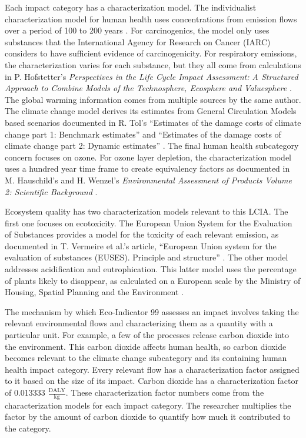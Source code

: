 \documentclass[final,journal,10pt,letterpaper,oneside,twocolumn,compsoc]%
{IEEEtran}
\begin{document}
Each impact category has a characterization model. The individualist
characterization model for human health uses concentrations from emission flows
over a period of 100 to 200 years \cite{pre-annex}. For carcinogenics, the model
only uses
substances that the International Agency for Research on Cancer (IARC) considers
to have sufficient evidence of carcinogenicity. For respiratory emissions, the
characterization varies for each substance, but they all come from calculations
in P. Hofstetter's
\textit{Perspectives in the Life Cycle Impact Assessment: A Structured Approach
to Combine Models of the Technosphere, Ecosphere and Valuesphere} \cite{lcia}.
The global warming information comes from multiple sources by the same author.
The climate change model derives its estimates from General
Circulation Models based scenarios documented in R. Tol's
``Estimates of the damage costs of climate change part 1: Benchmark estimates''
and ``Estimates of the damage costs of climate change part 2: Dynamic
estimates'' \cite{climate1}
\cite{climate2}. The final human health subcategory concern focuses on ozone.
For ozone
layer depletion, the characterization model uses a
hundred year time frame to create equivalency factors as documented in
M. Hauschild's and H. Wenzel's \textit{Environmental Assessment of Products
Volume 2: Scientific Background} \cite{ozone}.

Ecosystem quality has two characterization models relevant to this LCIA. The
first one focuses on ecotoxicity. The European Union System for the Evaluation
of Substances provides a model for the toxicity of each relevant emission, as
documented in T. Vermeire et al.'s article, ``European Union system for the
evaluation of substances (EUSES). Principle and structure''
\cite{euses}. The other model addresses acidification and eutrophication. This
latter model uses the percentage of plants likely to disappear, as calculated on
a
European scale by the Ministry of Housing, Spatial Planning and the Environment
\cite{pre}.

The mechanism by which Eco-Indicator 99 assesses an impact involves taking the
relevant environmental flows and characterizing them as a quantity with a
particular unit. For
example, a few of the processes release carbon dioxide into the environment.
This
carbon dioxide affects human health, so carbon dioxide becomes relevant to the
climate change subcategory and its containing human health impact category.
Every relevant flow has a
characterization factor assigned to it based on the size of its impact. Carbon dioxide has
a characterization factor of 0.013333 $\frac{\textrm{DALY}}{\textrm{kg}}$.
These
characterization factor numbers come from the characterization models for each
impact category.
The researcher multiplies the factor by the
amount of carbon dioxide to
quantify how much it contributed to the category. 
\end{document}
